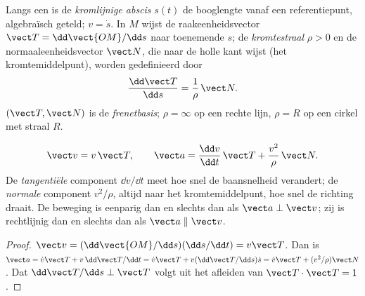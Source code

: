 \begin{definition}\label{def:b1:point-kinematics:frenet}
Langs een  is de \emph{kromlijnige abscis} $s(t)$ de booglengte
vanaf een referentiepunt, algebraïsch geteld; $v = \dot s$. In
$M$ wijst de raakeenheidsvector $\vect T = \dd\vect{OM}/\dd s$ naar
toenemende $s$; de \emph{kromtestraal} $\rho > 0$ en de
normaaleenheidsvector $\vect N$, die naar de holle kant wijst (het
kromtemiddelpunt), worden gedefinieerd door
\[
\frac{\dd\vect T}{\dd s} = \frac{1}{\rho}\,\vect N .
\]
$(\vect T, \vect N)$ is de \emph{frenetbasis}; $\rho = \infty$ op een
rechte lijn, $\rho = R$ op een cirkel met straal $R$.
\end{definition}

\begin{theorem}\label{thm:b1:point-kinematics:frenet}
\[
\vect v = v\,\vect T, \qquad
\vect a = \frac{\dd v}{\dd t}\,\vect T + \frac{v^2}{\rho}\,\vect N .
\]
De \emph{tangentiële} component $\dd v/\dd t$ meet hoe snel de
baansnelheid verandert; de \emph{normale} component $v^2/\rho$, altijd naar
het kromtemiddelpunt, hoe snel de richting draait. De beweging is
eenparig dan en slechts dan als $\vect a \perp \vect v$; zij is rechtlijnig dan en slechts dan als
$\vect a \parallel \vect v$.
\end{theorem}

\begin{proof}
$\vect v = (\dd\vect{OM}/\dd s)(\dd s/\dd t) = v\vect T$. Dan is $\vect a =
\dot v\vect T + v\,\dd\vect T/\dd t = \dot v\vect T + v(\dd\vect T/\dd s)\dot s
= \dot v\vect T + (v^2/\rho)\vect N$. Dat $\dd\vect T/\dd s \perp \vect T$
volgt uit het afleiden van $\vect T\cdot\vect T = 1$.
\end{proof}

